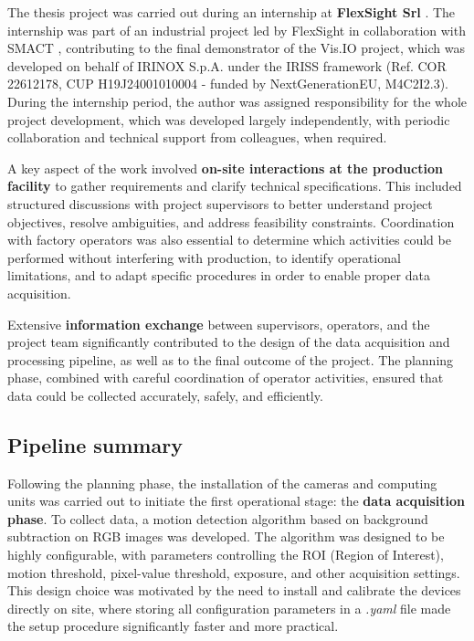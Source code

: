 
The thesis project was carried out during an internship at \textbf{FlexSight Srl} \cite{flexsight_home_2026}. The internship was part of an industrial project led by FlexSight in collaboration with SMACT \cite{smact_official_2026}, contributing to the final demonstrator of the Vis.IO project, which was developed on behalf of IRINOX S.p.A. under the IRISS framework (Ref. COR 22612178, CUP H19J24001010004 - funded by NextGenerationEU, M4C2I2.3).
During the internship period, the author was assigned responsibility for the whole project development, which was developed largely independently, with periodic collaboration and technical support from colleagues, when required.

A key aspect of the work involved \textbf{on-site interactions at the production facility} to gather requirements and clarify technical specifications. This included structured discussions with project supervisors to better understand project objectives, resolve ambiguities, and address feasibility constraints. Coordination with factory operators was also essential to determine which activities could be performed without interfering with production, to identify operational limitations, and to adapt specific procedures in order to enable proper data acquisition.

Extensive \textbf{information exchange} between supervisors, operators, and the project team significantly contributed to the design of the data acquisition and processing pipeline, as well as to the final outcome of the project. The planning phase, combined with careful coordination of operator activities, ensured that data could be collected accurately, safely, and efficiently.
\newpage
\subsection{Pipeline summary}
Following the planning phase, the installation of the cameras and computing units was carried out to initiate the first operational stage: the \textbf{data acquisition phase}.
To collect data, a motion detection algorithm based on background subtraction on RGB images was developed. The algorithm was designed to be highly configurable, with parameters controlling the ROI (Region of Interest), motion threshold, pixel-value threshold, exposure, and other acquisition settings. This design choice was motivated by the need to install and calibrate the devices directly on site, where storing all configuration parameters in a \textit{.yaml} file made the setup procedure significantly faster and more practical.

